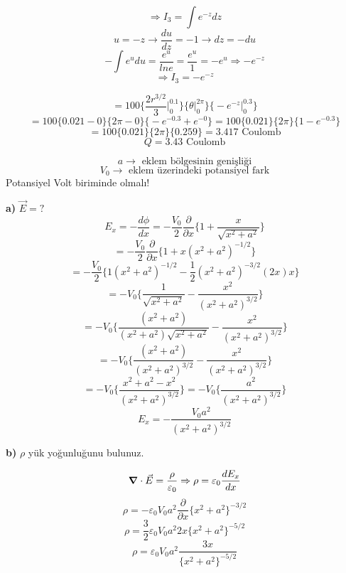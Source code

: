 \begin{example}
\begin{tcolorbox}
\[ \Rightarrow I_{3} = \int e ^{-z} dz  \]
\[ u = -z \rightarrow \dfrac{du}{dz} = -1 \rightarrow dz = -du \]
\[  - \int e^{u} du = \dfrac{e^{u}}{ln e} = \dfrac{e^{u}}{1} = - e^{u} \Rightarrow - e^{-z} \]
\[ \Rightarrow I_{3} = - e^{-z} \]
\end{tcolorbox}
\[ = 100  \Bigg\{ \dfrac{2r^{3/2}}{3} \Bigg|_{0}^{0.1} \Bigg\} \Bigg\{ \theta \Bigg|_{0}^{2 \pi} \Bigg\}  \Bigg\{ - e^{-z} \Bigg|_{0}^{0.3} \Bigg\} \]
\[ = 100  \Bigg\{ 0.021 - 0  \Bigg\} \Bigg\{ 2 \pi - 0  \Bigg\}  \Bigg\{ - e^{-0.3} + e^{-0} \Bigg\} = 100  \Bigg\{ 0.021  \Bigg\} \Bigg\{ 2 \pi   \Bigg\}  \Bigg\{ 1 - e^{-0.3} \Bigg\}  \]
\[ = 100  \Bigg\{ 0.021  \Bigg\} \Bigg\{ 2 \pi   \Bigg\}  \Bigg\{ 0.259 \Bigg\} = 3.417 \textrm{ Coulomb} \]
\[ Q = 3.43 \textrm{ Coulomb} \]
\end{example}

\newpage

\begin{example}[$\phi (x) = \dfrac{V_{0}}{2} \big\{ 1 + \dfrac{x}{\sqrt{x^{2} + a^{2}}} \big\} $] 
\[ a \rightarrow \textrm{ eklem bölgesinin genişliği} \]
\[ V_{0} \rightarrow \textrm{ eklem üzerindeki potansiyel fark} \]
Potansiyel Volt biriminde olmalı!
\

\textbf{a)} $\Vec{E} = ?$
\[ E_{x} =  - \dfrac{d \phi}{dx} = - \dfrac{V_{0}}{2} \dfrac{\partial}{\partial x} \Big\{  1 + \dfrac{x}{\sqrt{x^{2} + a^{2}}} \Big\} \]
\[ = - \dfrac{V_{0}}{2} \dfrac{\partial}{\partial x} \Big\{  1 + x (x^{2} + a^{2})^{-1/2}  \Big\}\]
\[ =   - \dfrac{V_{0}}{2}  \Big\{ 1 (x^{2} + a^{2})^{-1/2} - \dfrac{1}{2}  (x^{2} + a^{2})^{-3/2} (2x) x \Big\} \]
\[ =   - V_{0}  \Big\{  \dfrac{1}{\sqrt{x^{2} + a^{2}}} - \dfrac{x^{2}}{(x^{2} + a^{2})^{3/2}} \Big\} \]
\[ =   - V_{0}  \Big\{  \dfrac{(x^{2} + a^{2})}{(x^{2} + a^{2}) \sqrt{x^{2} + a^{2}}} - \dfrac{x^{2}}{(x^{2} + a^{2})^{3/2}} \Big\} \]
\[ =   - V_{0}  \Big\{  \dfrac{(x^{2} + a^{2})}{(x^{2} + a^{2})^{3/2}} - \dfrac{x^{2}}{(x^{2} + a^{2})^{3/2}} \Big\} \]
\[ =   - V_{0}  \Big\{  \dfrac{x^{2} + a^{2} -x^{2}}{(x^{2} + a^{2})^{3/2}} \Big\} = - V_{0}  \Big\{  \dfrac{a^{2}}{(x^{2} + a^{2})^{3/2}} \Big\}  \]
\[ E_{x} = - \dfrac{V_{0} a^{2}}{(x^{2} + a^{2})^{3/2}} \]

\textbf{b)} $\rho$ yük yoğunluğunu bulunuz.

\[ \grad \cdot \Vec{E} = \dfrac{\rho}{\varepsilon_{0}} \Rightarrow \rho = \varepsilon_{0} \dfrac{d E_{x}}{dx} \]
\[ \rho = - \varepsilon_{0} V_{0} a^{2} \dfrac{\partial}{\partial x} \Big\{ x^{2} + a^{2} \Big\}^{-3/2} \]
\[ \rho = \dfrac{3}{2} \varepsilon_{0} V_{0} a^{2} 2x \Big\{ x^{2} + a^{2} \Big\}^{-5/2} \]
\[ \rho =  \varepsilon_{0} V_{0} a^{2} \dfrac{3x}{\Big\{ x^{2} + a^{2} \Big\}^{-5/2}} \]
\end{example}


